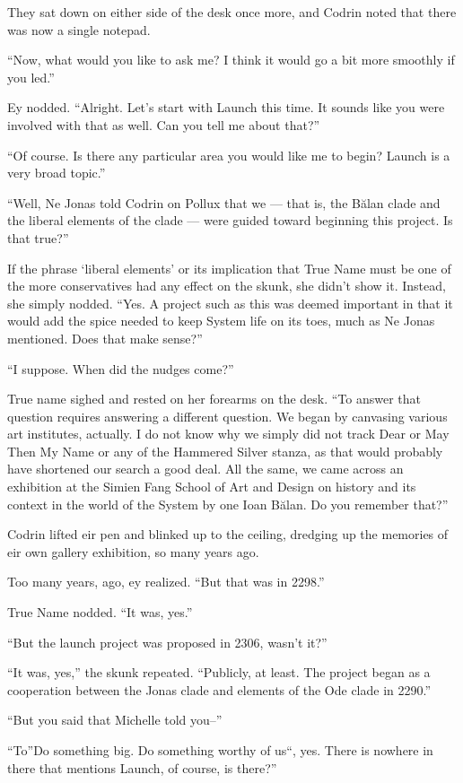 They sat down on either side of the desk once more, and Codrin noted that there was now a single notepad.

``Now, what would you like to ask me? I think it would go a bit more smoothly if you led.''

Ey nodded. ``Alright. Let's start with Launch this time. It sounds like you were involved with that as well. Can you tell me about that?''

``Of course. Is there any particular area you would like me to begin? Launch is a very broad topic.''

``Well, Ne Jonas told Codrin on Pollux that we — that is, the Bălan clade and the liberal elements of the clade — were guided toward beginning this project. Is that true?''

If the phrase `liberal elements' or its implication that True Name must be one of the more conservatives had any effect on the skunk, she didn't show it. Instead, she simply nodded. ``Yes. A project such as this was deemed important in that it would add the spice needed to keep System life on its toes, much as Ne Jonas mentioned. Does that make sense?''

``I suppose. When did the nudges come?''

True name sighed and rested on her forearms on the desk. ``To answer that question requires answering a different question. We began by canvasing various art institutes, actually. I do not know why we simply did not track Dear or May Then My Name or any of the Hammered Silver stanza, as that would probably have shortened our search a good deal. All the same, we came across an exhibition at the Simien Fang School of Art and Design on history and its context in the world of the System by one Ioan Bălan. Do you remember that?''

Codrin lifted eir pen and blinked up to the ceiling, dredging up the memories of eir own gallery exhibition, so many years ago.

Too many years, ago, ey realized. ``But that was in 2298.''

True Name nodded. ``It was, yes.''

``But the launch project was proposed in 2306, wasn't it?''

``It was, yes,'' the skunk repeated. ``Publicly, at least. The project began as a cooperation between the Jonas clade and elements of the Ode clade in 2290.''

``But you said that Michelle told you--''

``To''Do something big. Do something worthy of us``, yes. There is nowhere in there that mentions Launch, of course, is there?''

